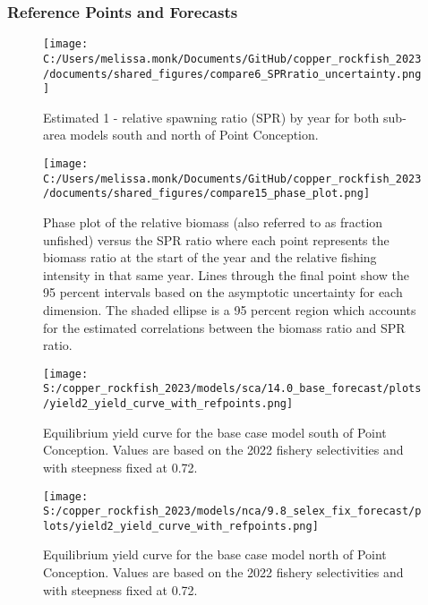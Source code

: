 \documentclass[
  letterpaper,
]{article}
\begin{document}
\newpage

\hypertarget{reference-points-and-forecasts}{%
\subsubsection{Reference Points and Forecasts}\label{reference-points-and-forecasts}}

\begin{figure}
\centering
\texttt{[image: C:/Users/melissa.monk/Documents/GitHub/copper\_rockfish\_2023/documents/shared\_figures/compare6\_SPRratio\_uncertainty.png]}
\caption{Estimated 1 - relative spawning ratio (SPR) by year for both sub-area models south and north of Point Conception.\label{fig:1-spr}}
\end{figure}

\clearpage

\begin{figure}
\centering
\texttt{[image: C:/Users/melissa.monk/Documents/GitHub/copper\_rockfish\_2023/documents/shared\_figures/compare15\_phase\_plot.png]}
\caption{Phase plot of the relative biomass (also referred to as fraction unfished) versus the SPR ratio where each point represents the biomass ratio at the start of the year and the relative fishing intensity in that same year. Lines through the final point show the 95 percent intervals based on the asymptotic uncertainty for each dimension. The shaded ellipse is a 95 percent region which accounts for the estimated correlations between the biomass ratio and SPR ratio.\label{fig:phase}}
\end{figure}

\pagebreak

\begin{figure}
\centering
\texttt{[image: S:/copper\_rockfish\_2023/models/sca/14.0\_base\_forecast/plots/yield2\_yield\_curve\_with\_refpoints.png]}
\caption{Equilibrium yield curve for the base case model south of Point Conception. Values are based on the 2022
fishery selectivities and with steepness fixed at 0.72.\label{fig:yield-south}}
\end{figure}

\pagebreak

\begin{figure}
\centering
\texttt{[image: S:/copper\_rockfish\_2023/models/nca/9.8\_selex\_fix\_forecast/plots/yield2\_yield\_curve\_with\_refpoints.png]}
\caption{Equilibrium yield curve for the base case model north of Point Conception. Values are based on the 2022
fishery selectivities and with steepness fixed at 0.72.\label{fig:yield-north}}
\end{figure}
\end{document}
